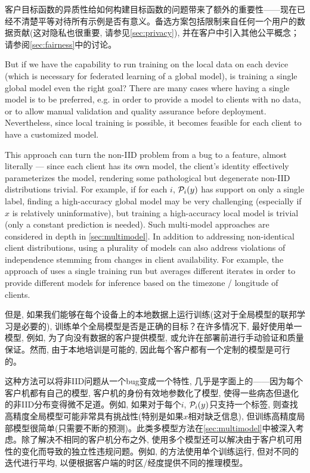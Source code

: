 客户目标函数的异质性给如何构建目标函数的问题带来了额外的重要性——现在已经不清楚平等对待所有示例是否有意义。备选方案包括限制来自任何一个用户的数据贡献(这对隐私也很重要, 请参见\cref{sec:privacy}), 并在客户中引入其他公平概念；请参阅\cref{sec:fairness}中的讨论。

But if we have the capability to run training on the local data on each device (which is necessary for federated learning of a global model), is training a single global model even the right goal? There are many cases where having a single model is to be preferred, e.g. in order to provide a model to clients with no data, or to allow manual validation and quality assurance before deployment. Nevertheless, since local training is possible, it becomes feasible for each client to have a customized model. 

This approach can turn the non-IID problem from a bug to a feature, almost literally --- since each client has its own model, the client's identity effectively parameterizes the model, rendering some pathological but degenerate non-IID distributions trivial. For example, if for each $i$,  $\mathcal{P}_i(y)$ has support on only a single label, finding a high-accuracy global model may be very challenging (especially if $x$ is relatively uninformative), but training a high-accuracy local model is trivial (only a constant prediction is needed). Such multi-model approaches are considered in depth in \cref{sec:multimodel}. In addition to addressing non-identical client distributions, using a plurality of models can also address violations of independence stemming from changes in client availability. For example, the approach of \citet{eichner19semicyclic} uses a single training run but averages different iterates in order to provide different models for inference based on the timezone / longitude of clients.

但是, 如果我们能够在每个设备上的本地数据上运行训练(这对于全局模型的联邦学习是必要的), 训练单个全局模型是否是正确的目标？在许多情况下, 最好使用单一模型, 例如, 为了向没有数据的客户提供模型, 或允许在部署前进行手动验证和质量保证。然而, 由于本地培训是可能的, 因此每个客户都有一个定制的模型是可行的。

这种方法可以将非IID问题从一个bug变成一个特性, 几乎是字面上的——因为每个客户机都有自己的模型, 客户机的身份有效地参数化了模型, 使得一些病态但退化的非IID分布变得微不足道。例如, 如果对于每个$i$, $\mathcal{P}_i(y)$只支持一个标签, 则查找高精度全局模型可能非常具有挑战性(特别是如果$x$相对缺乏信息), 但训练高精度局部模型很简单(只需要不断的预测)。此类多模型方法在\cref{sec:multimodel}中被深入考虑。除了解决不相同的客户机分布之外, 使用多个模型还可以解决由于客户机可用性的变化而导致的独立性违规问题。例如, \citet{eichner19semicyclic}的方法使用单个训练运行, 但对不同的迭代进行平均, 以便根据客户端的时区/经度提供不同的推理模型。

